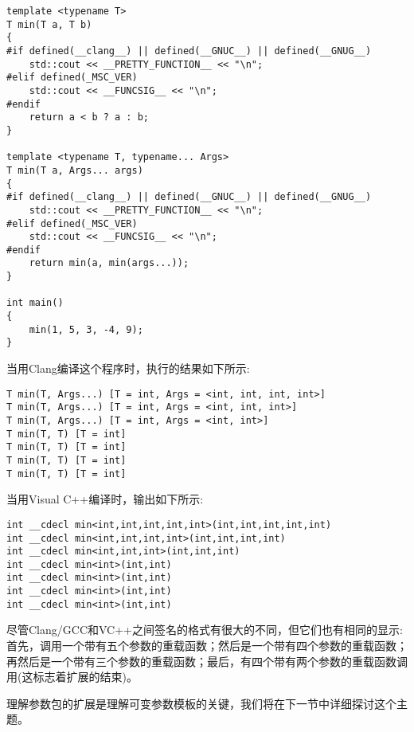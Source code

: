 \begin{lstlisting}[style=styleCXX]
template <typename T>
T min(T a, T b)
{
#if defined(__clang__) || defined(__GNUC__) || defined(__GNUG__)
	std::cout << __PRETTY_FUNCTION__ << "\n";
#elif defined(_MSC_VER)
	std::cout << __FUNCSIG__ << "\n";
#endif
	return a < b ? a : b;
}

template <typename T, typename... Args>
T min(T a, Args... args)
{
#if defined(__clang__) || defined(__GNUC__) || defined(__GNUG__)
	std::cout << __PRETTY_FUNCTION__ << "\n";
#elif defined(_MSC_VER)
	std::cout << __FUNCSIG__ << "\n";
#endif
	return min(a, min(args...));
}

int main()
{
	min(1, 5, 3, -4, 9);
}
\end{lstlisting}

当用Clang编译这个程序时，执行的结果如下所示:

\begin{lstlisting}[style=styleCXX]
T min(T, Args...) [T = int, Args = <int, int, int, int>]
T min(T, Args...) [T = int, Args = <int, int, int>]
T min(T, Args...) [T = int, Args = <int, int>]
T min(T, T) [T = int]
T min(T, T) [T = int]
T min(T, T) [T = int]
T min(T, T) [T = int]
\end{lstlisting}

当用Visual C++编译时，输出如下所示:

\begin{lstlisting}[style=styleCXX]
int __cdecl min<int,int,int,int,int>(int,int,int,int,int)
int __cdecl min<int,int,int,int>(int,int,int,int)
int __cdecl min<int,int,int>(int,int,int)
int __cdecl min<int>(int,int)
int __cdecl min<int>(int,int)
int __cdecl min<int>(int,int)
int __cdecl min<int>(int,int)
\end{lstlisting}

尽管Clang/GCC和VC++之间签名的格式有很大的不同，但它们也有相同的显示:首先，调用一个带有五个参数的重载函数；然后是一个带有四个参数的重载函数；再然后是一个带有三个参数的重载函数；最后，有四个带有两个参数的重载函数调用(这标志着扩展的结束)。

理解参数包的扩展是理解可变参数模板的关键，我们将在下一节中详细探讨这个主题。



